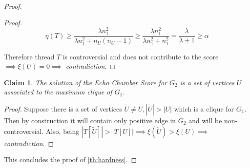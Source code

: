 \documentclass{article}
\newtheorem{claim}[theorem]{Claim}
\begin{document}
\begin{proof}
\begin{proof}
		\begin{equation}
			\eta(T) \geq \frac{\lambda n_{1} ^{2} }{\lambda n_{1} ^{2} + n_U (n_U -1) }
			\geq \frac{\lambda n_{1} ^{2} }{\lambda n_{1} ^{2} + n_{1} ^{2}  }
			= \frac{\lambda }{\lambda + 1} \geq \alpha
		\end{equation}

		Therefore thread $T$ is controversial and does not
		contribute to the score $\implies \xi(U) = 0 \implies$ \emph{contradiction}.
	\end{proof}

	\begin{claim}
		\label{th:max-clique}
		The solution of the Echo Chamber Score for $G_2$ is a set of vertices
		$U$ associated to the \emph{maximum clique} of $G_1$.
	\end{claim}

	\begin{proof}
		Suppose there is a set of vertices $\tilde{U} \neq U, |\tilde{U}| >
			|U|$ which is a clique for $G_1$. Then by construction it will
		contain only positive edge in $G_2$ and will be
		non-controversial. Also, being $|T[\tilde{U}]| > |T[U]| \implies
			\xi(\tilde{U}) > \xi(U) \implies $ \emph{contradiction}.
	\end{proof}

	This concludes the proof of \autoref{th:hardness}.
\end{proof}
\end{document}
